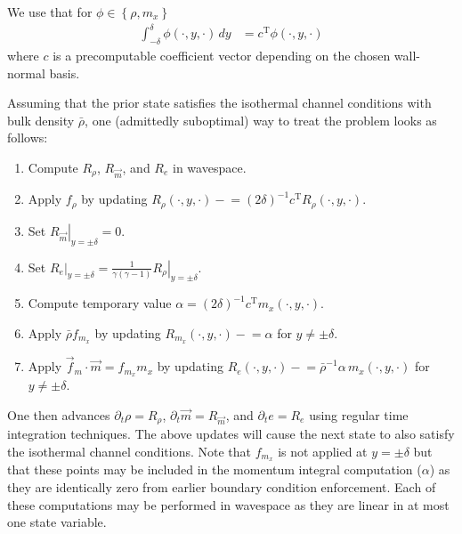 \documentclass[letterpaper,11pt,nointlimits,reqno]{amsart}
\begin{document}
We use that for
$\phi\in\left\{\rho,m_{x}\right\}$
\begin{align}
  \int_{-\delta}^{\delta} \phi\!\left(\cdot,y,\cdot\right)\,dy
  &=
  c^{\mathrm{T}}\phi\!\left(\cdot,y,\cdot\right)
\end{align}
where $c$ is a precomputable coefficient vector depending on the chosen
wall-normal basis.

Assuming that the prior state satisfies the isothermal channel conditions with
bulk density $\bar{\rho}$, one (admittedly suboptimal) way to treat the
problem looks as follows:
\begin{enumerate}
  \item Compute $R_{\rho}$, $R_{\vec{m}}$, and $R_{e}$ in wavespace.
  \item Apply $f_{\rho}$ by updating $R_{\rho}\!\left(\cdot,y,\cdot\right)
        -\!= \left(2\delta\right)^{-1} c^{\mathrm{T}}
        R_{\rho}\!\left(\cdot,y,\cdot\right)$.
  \item Set $\left.R_{\vec{m}}\right|_{y=\pm\delta} = 0$.
  \item Set $\left.R_{e}\right|_{y=\pm\delta} =
        \frac{1}{\gamma\left(\gamma-1\right)}
        \left.R_{\rho}\right|_{y=\pm\delta}$.
  \item Compute temporary value $\alpha =
        \left(2\delta\right)^{-1} c^{\mathrm{T}}
        m_{x}\!\left(\cdot,y,\cdot\right)$.
  \item Apply $\bar{\rho} f_{m_x}$ by updating
        $R_{m_x}\!\left(\cdot,y,\cdot\right) -\!= \alpha$ for $y\neq\pm\delta$.
  \item Apply $\vec{f}_{m}\cdot\vec{m} = f_{m_x} m_x$ by updating
        $R_{e}\!\left(\cdot,y,\cdot\right) -\!=
        \bar{\rho}^{-1} \alpha \, m_{x}\!\left(\cdot,y,\cdot\right)$
        for $y\neq\pm\delta$.
\end{enumerate}
One then advances $\partial_{t}\rho = R_{\rho}$, $\partial_{t} \vec{m} =
R_{\vec{m}}$, and $\partial_{t} e = R_{e}$ using regular time integration
techniques.  The above updates will cause the next state to also satisfy the
isothermal channel conditions.  Note that $f_{m_x}$ is not applied at
$y=\pm\delta$ but that these points may be included in the momentum integral
computation ($\alpha$) as they are identically zero from earlier boundary
condition enforcement.  Each of these computations may be performed in
wavespace as they are linear in at most one state variable.




\end{document}
